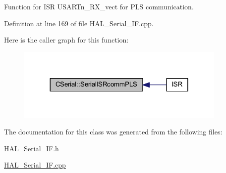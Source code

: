 Function for I\+SR U\+S\+A\+R\+Tn\+\_\+\+R\+X\+\_\+vect for P\+LS communication. 



Definition at line 169 of file H\+A\+L\+\_\+\+Serial\+\_\+\+I\+F.\+cpp.

Here is the caller graph for this function\+:\nopagebreak
\begin{figure}[H]
\begin{center}
\leavevmode
\includegraphics[width=288pt]{class_c_serial_a707841754d94fc1ab6679f52bf413d85_icgraph}
\end{center}
\end{figure}


The documentation for this class was generated from the following files\+:\begin{DoxyCompactItemize}
\item 
\mbox{\hyperlink{_h_a_l___serial___i_f_8h}{H\+A\+L\+\_\+\+Serial\+\_\+\+I\+F.\+h}}\item 
\mbox{\hyperlink{_h_a_l___serial___i_f_8cpp}{H\+A\+L\+\_\+\+Serial\+\_\+\+I\+F.\+cpp}}\end{DoxyCompactItemize}
